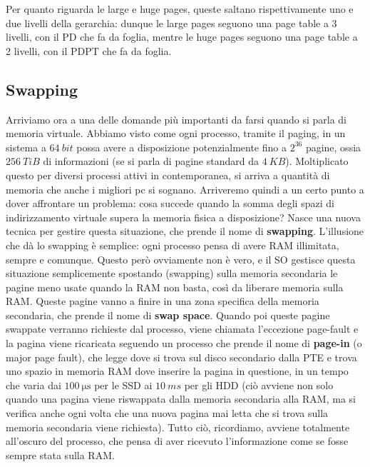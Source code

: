 \documentclass[11pt, a4paper, titlepage, oneside]{scrbook}
\begin{document}
Per quanto riguarda le large e huge pages, queste saltano rispettivamente uno e due livelli della gerarchia: dunque le large pages seguono una page table a 3 livelli, con il PD che fa da foglia, mentre le huge pages seguono una page table a 2 livelli, con il PDPT che fa da foglia.

\subsection{Swapping}

Arriviamo ora a una delle domande più importanti da farsi quando si parla di memoria virtuale. Abbiamo visto come ogni processo, tramite il paging, in un sistema a $\SI{64}{bit}$ possa avere a disposizione potenzialmente fino a $2^{36}$ pagine, ossia $\SI{256}{TiB}$ di informazioni (se si parla di pagine standard da $\SI{4}{KB}$). Moltiplicato questo per diversi processi attivi in contemporanea, si arriva a quantità di memoria che anche i migliori pc si sognano. Arriveremo quindi a un certo punto a dover affrontare un problema: cosa succede quando la somma degli spazi di indirizzamento virtuale supera la memoria fisica a disposizione? Nasce una nuova tecnica per gestire questa situazione, che prende il nome di \textbf{swapping}. L'illusione che dà lo swapping è semplice: ogni processo pensa di avere RAM illimitata, sempre e comunque. Questo però ovviamente non è vero, e il SO gestisce questa situazione semplicemente spostando (swapping) sulla memoria secondaria le pagine meno usate quando la RAM non basta, così da liberare memoria sulla RAM. Queste pagine vanno a finire in una zona specifica della memoria secondaria, che prende il nome di \textbf{swap space}. Quando poi queste pagine swappate verranno richieste dal processo, viene chiamata l'eccezione page-fault e la pagina viene ricaricata seguendo un processo che prende il nome di \textbf{page-in} (o major page fault), che legge dove si trova sul disco secondario dalla PTE e trova uno spazio in memoria RAM dove inserire la pagina in questione, in un tempo che varia dai $\SI{100}{\micro\second}$ per le SSD ai $\SI{10}{ms}$ per gli HDD (ciò avviene non solo quando una pagina viene riswappata dalla memoria secondaria alla RAM, ma si verifica anche ogni volta che una nuova pagina mai letta che si trova sulla memoria secondaria viene richiesta). Tutto ciò, ricordiamo, avviene totalmente all'oscuro del processo, che pensa di aver ricevuto l'informazione come se fosse sempre stata sulla RAM.
\end{document}
